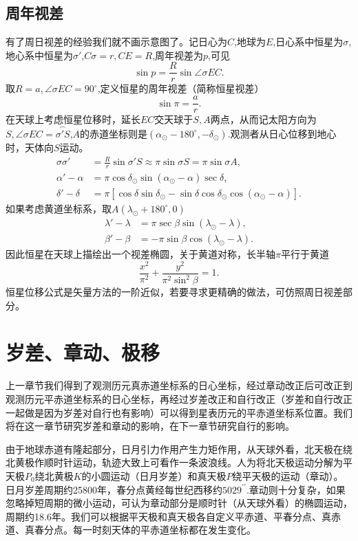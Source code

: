 \documentclass[11pt, a4paper, oneside]{ctexart}
\numberwithin{equation}{subsection}
\begin{document}
\subsection{周年视差}
有了周日视差的经验我们就不画示意图了。记日心为$C$,地球为$E$,日心系中恒星为$\sigma$,地心系中恒星为$\sigma'$,$C\sigma=r,CE=R$,周年视差为$p$,可见
\begin{equation}
\sin p=\frac{R}{r}\sin\angle{\sigma EC}.
\end{equation}
取$R=a,\angle{\sigma EC}=90^{\circ}$,定义恒星的周年视差（简称恒星视差）
\begin{equation}
\sin\pi=\frac{a}{r}.
\end{equation}
在天球上考虑恒星位移时，延长$EC$交天球于$S,A$两点，从而记太阳方向为$S,\angle{\sigma EC}=\overset{\frown}{\sigma'S}$,$A$的赤道坐标则是$\left(\alpha_{\odot}-180^{\circ},-\delta{}_{\odot}\right)$.观测者从日心位移到地心时，天体向$S$运动。
\begin{align}
\sigma\sigma'&=\frac{R}{r}\sin\sigma'S\approx\pi\sin\sigma S=\pi\sin\sigma A,\\
\alpha'-\alpha&=\pi\cos\delta_\odot\sin\left(\alpha_\odot-\alpha\right)\sec\delta,\\
\delta'-\delta&=\pi\left[\cos\delta\sin\delta_\odot-\sin\delta\cos\delta_\odot\cos\left(\alpha_\odot-\alpha\right)\right].
\end{align}
如果考虑黄道坐标系，取$A\left(\lambda_\odot+180^\circ,0\right)$
\begin{align}
\lambda'-\lambda&=\pi\sec\beta\sin\left(\lambda_\odot-\lambda\right),\\
\beta'-\beta&=-\pi\sin\beta\cos\left(\lambda_\odot-\lambda\right).
\end{align}
因此恒星在天球上描绘出一个视差椭圆，关于黄道对称，长半轴$\pi$平行于黄道
\begin{equation}
\frac{x^2}{\pi^2}+\frac{y^2}{\pi^2\sin^2\beta}=1.
\end{equation}
恒星位移公式是矢量方法的一阶近似，若要寻求更精确的做法，可仿照周日视差部分。

\section{岁差、章动、极移}
上一章节我们得到了观测历元真赤道坐标系的日心坐标，经过章动改正后可改正到观测历元平赤道坐标系的日心坐标，再经过岁差改正和自行改正（岁差和自行改正一起做是因为岁差对自行也有影响）可以得到星表历元的平赤道坐标系位置。我们将在这一章节研究岁差和章动的影响，在下一章节研究自行的影响。

由于地球赤道有隆起部分，日月引力作用产生力矩作用，从天球外看，北天极在绕北黄极作顺时针运动，轨迹大致上可看作一条波浪线。人为将北天极运动分解为平天极$P_{0}$绕北黄极$K$的小圆运动（日月岁差）和真天极$P$绕平天极的运动（章动）。日月岁差周期约25800年，春分点黄经每世纪西移约$5029^{\prime\prime}$.章动则十分复杂，如果忽略掉短周期的微小运动，可认为章动部分是顺时针（从天球外看）的椭圆运动，周期约18.6年。我们可以根据平天极和真天极各自定义平赤道、平春分点、真赤道、真春分点。每一时刻天体的平赤道坐标都在发生变化。
\end{document}
